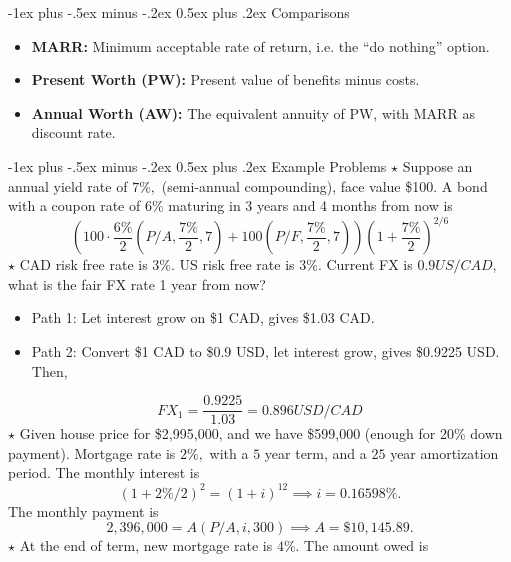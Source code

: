 \documentclass[11pt,landscape]{article}
\makeatletter
\renewcommand{\section}{\@startsection{section}{1}{0mm}%
                                {-1ex plus -.5ex minus -.2ex}%
                                {0.5ex plus .2ex}%
                                {\normalfont\large\bfseries}}
\makeatother
\begin{document}
\begin{multicols*}{3}
\section{Comparisons}
\begin{itemize}
    \item \textbf{MARR:} Minimum acceptable rate of return, i.e. the ``do nothing'' option.
    \item \textbf{Present Worth (PW):} Present value of benefits minus costs.
    \item \textbf{Annual Worth (AW):} The equivalent annuity of PW, with MARR as discount rate.
\end{itemize}
\section{Example Problems}
$\star$ Suppose an annual yield rate of $7\%,$ (semi-annual compounding), face value \$100. A bond with a coupon rate of $6\%$ maturing in 3 years and 4 months from now is 
\begin{equation*}
    \left(100\cdot \frac{6\%}{2}(P/A,\frac{7\%}{2},7) + 100(P/F,\frac{7\%}{2},7)\right)\left(1+\frac{7\%}{2}\right)^{2/6}
\end{equation*}
$\star$ CAD risk free rate is $3\%.$ US risk free rate is $3\%.$ Current FX is $0.9 US/CAD$, what is the fair FX rate 1 year from now? 
\begin{itemize}
    \item Path 1: Let interest grow on \$1 CAD, gives \$1.03 CAD.
    \item Path 2: Convert \$1 CAD to \$0.9 USD, let interest grow, gives \$0.9225 USD. Then,
\end{itemize}
\begin{equation*}
    FX_1 = \frac{0.9225}{1.03} = 0.896 USD/CAD
\end{equation*}
$\star$ Given house price for \$2,995,000, and we have \$599,000 (enough for 20\% down payment). Mortgage rate is $2\%,$ with a $5$ year term, and a $25$ year amortization period. The monthly interest is 
\begin{equation*}
    (1+2\%/2)^2 = (1+i)^{12} \implies i = 0.16598\%.
\end{equation*} 
The monthly payment is
\begin{equation*}
    2,396,000 = A(P/A,i,300) \implies A = \$10,145.89.
\end{equation*}
$\star$ At the end of term, new mortgage rate is $4\%.$ The amount owed is 
\begin{equation*}

\end{equation*}
\end{multicols*}
\end{document}

